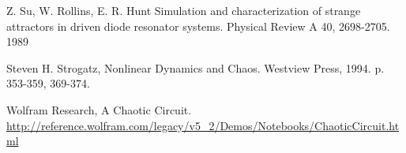 \documentclass[12pt]{report}
\begin{document}

\begin{thebibliography}{9}

  Z. Su, W. Rollins, E. R. Hunt
  Simulation and characterization of strange attractors in driven diode resonator systems.
  Physical Review A 40, 2698-2705.
  1989

  Steven H. Strogatz,
  Nonlinear Dynamics and Chaos.
  Westview Press,
  1994. p. 353-359, 369-374.
  
  Wolfram Research,
  A Chaotic Circuit.
  \url{http://reference.wolfram.com/legacy/v5_2/Demos/Notebooks/ChaoticCircuit.html}

\end{thebibliography}
\end{document}
